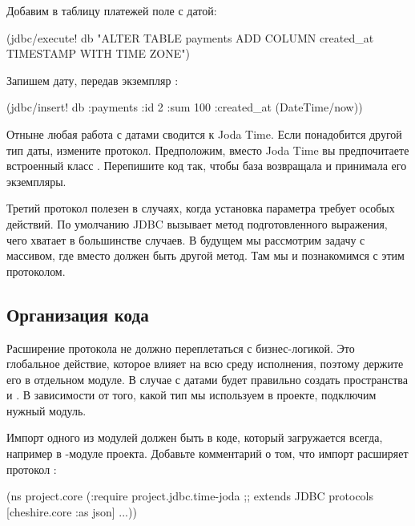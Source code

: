 Добавим в таблицу платежей поле с датой:

\begin{english}
  \begin{clojure}
(jdbc/execute!
  db "ALTER TABLE payments
      ADD COLUMN created_at TIMESTAMP WITH TIME ZONE")
  \end{clojure}
\end{english}

Запишем дату, передав экземпляр :

\begin{english}
  \begin{clojure}
(jdbc/insert!
  db :payments
  {:id 2 :sum 100 :created_at (DateTime/now)})
  \end{clojure}
\end{english}

Отныне любая работа с датами сводится к Joda Time. Если понадобится другой тип даты, измените протокол. Предположим, вместо Joda Time вы предпочитаете встроенный класс . Перепишите код так, чтобы база возвращала и принимала его экземпляры.

Третий протокол  полезен в случаях, когда установка параметра требует особых действий. По умолчанию JDBC вызывает метод  подготовленного выражения, чего хватает в большинстве случаев. В будущем мы рассмотрим задачу с массивом, где вместо  должен быть другой метод. Там мы и познакомимся с этим протоколом.

\subsection{Организация кода}

Расширение протокола не должно переплетаться с бизнес-логикой. Это глобальное действие, которое влияет на всю среду исполнения, поэтому держите его в отдельном модуле. В случае с датами будет правильно создать пространства  и . В зависимости от того, какой тип мы используем в проекте, подключим нужный модуль.

Импорт одного из модулей должен быть в коде, который загружается всегда, например в -модуле проекта. Добавьте комментарий о том, что импорт расширяет протокол :


\begin{english}
  \begin{clojure/lines}
(ns project.core
  (:require
   project.jdbc.time-joda ;; extends JDBC protocols
   [cheshire.core :as json]
   ...))
  \end{clojure/lines}
\end{english}

